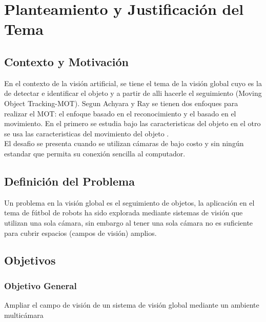 
\chapter{Planteamiento y Justificaci\'on del Tema}
\section{Contexto y Motivaci\'on}
En el contexto de la visi\'on artificial, se tiene el tema de la visi\'on global cuyo  es la de detectar e identificar el objeto y  a partir de alli hacerle el seguimiento (Moving Object Tracking-MOT). Segun Achyara y Ray  se tienen dos enfoques para realizar el MOT: el enfoque basado en el reconocimiento y el basado en el movimiento. En el primero se estudia bajo las caracteristicas del objeto en el otro se usa las caracteristicas del movimiento del objeto \cite{acharya_g}.\\
El desafio se presenta cuando se utilizan c\'amaras de bajo costo y sin ning\'un estandar que permita su conexi\'on sencilla al computador.

\section{Definici\'on del Problema}
Un problema en la visi\'on global es el seguimiento de objetos, la aplicaci\'on en el tema de f\'utbol de robots ha sido explorada mediante sistemas de visi\'on que utilizan una sola c\'amara, sin embargo al tener una sola c\'amara no es suficiente para cubrir espacios (campos de visi\'on) amplios.
\section{Objetivos}
\subsection{Objetivo General}
Ampliar el campo de visi\'on de un sistema de visi\'on global mediante un ambiente multic\'amara
